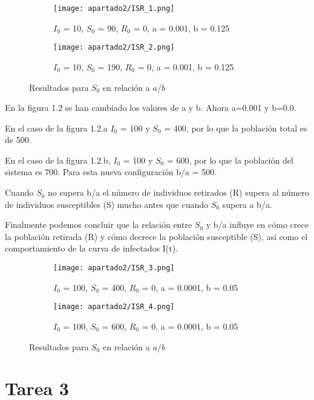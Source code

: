 \begin{figure}[H]
	\centering
	\begin{subfigure}[b]{0.8\textwidth}
		\centering
		\texttt{[image: apartado2/ISR\_1.png]}
		\caption{$I_0$ = 10, $S_0$ = 90, $R_0$ = 0, a = 0.001, b = 0.125}
	\end{subfigure}
	\hfill
	\begin{subfigure}[b]{0.8\textwidth}
		\centering
		\texttt{[image: apartado2/ISR\_2.png]}
		\caption{$I_0$ = 10, $S_0$ = 190, $R_0$ = 0, a = 0.001, b = 0.125}
	\end{subfigure}
	\caption{Resultados para $S_0$ en relación a $a/b$}
\end{figure}

\newpage

En la figura 1.2 se han cambiado los valores de a y b. Ahora a=0.001 y b=0.0.

En el caso de la figura 1.2.a $I_0$ = 100 y $S_0$ = 400, por lo que la población total es de 500.

En el caso de la figura 1.2.b, $I_0$ = 100 y $S_0$ = 600, por lo que la población del sistema es 700. Para esta nueva configuración b/a = 500.

Cuando $S_0$ no supera b/a el número de individuos retirados (R) supera al número de individuos susceptibles (S) mucho antes que cuando $S_0$ supera a b/a.

Finalmente podemos concluir que la relación entre $S_0$ y b/a influye en cómo crece la población retirada (R) y cómo decrece la población susceptible (S), así como el comportamiento de la curva de infectados I(t).


\begin{figure}[H]
	\centering
	\begin{subfigure}[b]{0.8\textwidth}
		\centering
		\texttt{[image: apartado2/ISR\_3.png]}
		\caption{$I_0$ = 100, $S_0$ = 400, $R_0$ = 0, a = 0.0001, b = 0.05}
	\end{subfigure}
	\hfill
	\begin{subfigure}[b]{0.8\textwidth}
		\centering
		\texttt{[image: apartado2/ISR\_4.png]}
		\caption{$I_0$ = 100, $S_0$ = 600, $R_0$ = 0, a = 0.0001, b = 0.05}
	\end{subfigure}
	\caption{Resultados para $S_0$ en relación a $a/b$}
\end{figure}

\newpage

\section{Tarea 3}

